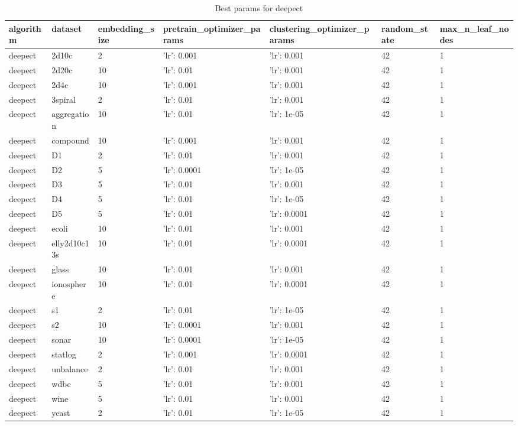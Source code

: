\begin{table}[H]
\centering
\caption{Best params for deepect}
\label{tab:params:deepect}
\begin{tabular}{|l|l|l|l|l|l|l|}
\hline
algorithm & dataset & embedding\_size & pretrain\_optimizer\_params & clustering\_optimizer\_params & random\_state & max\_n\_leaf\_nodes \\
\hline
deepect & 2d10c & 2 & {'lr': 0.001} & {'lr': 0.001} & 42 & 1 \\
\hline
deepect & 2d20c & 10 & {'lr': 0.01} & {'lr': 0.001} & 42 & 1 \\
\hline
deepect & 2d4c & 10 & {'lr': 0.001} & {'lr': 0.001} & 42 & 1 \\
\hline
deepect & 3spiral & 2 & {'lr': 0.01} & {'lr': 0.001} & 42 & 1 \\
\hline
deepect & aggregation & 10 & {'lr': 0.01} & {'lr': 1e-05} & 42 & 1 \\
\hline
deepect & compound & 10 & {'lr': 0.001} & {'lr': 0.001} & 42 & 1 \\
\hline
deepect & D1 & 2 & {'lr': 0.01} & {'lr': 0.001} & 42 & 1 \\
\hline
deepect & D2 & 5 & {'lr': 0.0001} & {'lr': 1e-05} & 42 & 1 \\
\hline
deepect & D3 & 5 & {'lr': 0.01} & {'lr': 0.001} & 42 & 1 \\
\hline
deepect & D4 & 5 & {'lr': 0.01} & {'lr': 1e-05} & 42 & 1 \\
\hline
deepect & D5 & 5 & {'lr': 0.01} & {'lr': 0.0001} & 42 & 1 \\
\hline
deepect & ecoli & 10 & {'lr': 0.01} & {'lr': 0.001} & 42 & 1 \\
\hline
deepect & elly2d10c13s & 10 & {'lr': 0.01} & {'lr': 0.0001} & 42 & 1 \\
\hline
deepect & glass & 10 & {'lr': 0.01} & {'lr': 0.001} & 42 & 1 \\
\hline
deepect & ionosphere & 10 & {'lr': 0.01} & {'lr': 0.0001} & 42 & 1 \\
\hline
deepect & s1 & 2 & {'lr': 0.01} & {'lr': 1e-05} & 42 & 1 \\
\hline
deepect & s2 & 10 & {'lr': 0.0001} & {'lr': 0.001} & 42 & 1 \\
\hline
deepect & sonar & 10 & {'lr': 0.0001} & {'lr': 1e-05} & 42 & 1 \\
\hline
deepect & statlog & 2 & {'lr': 0.001} & {'lr': 0.0001} & 42 & 1 \\
\hline
deepect & unbalance & 2 & {'lr': 0.01} & {'lr': 0.001} & 42 & 1 \\
\hline
deepect & wdbc & 5 & {'lr': 0.01} & {'lr': 0.001} & 42 & 1 \\
\hline
deepect & wine & 5 & {'lr': 0.01} & {'lr': 0.001} & 42 & 1 \\
\hline
deepect & yeast & 2 & {'lr': 0.01} & {'lr': 1e-05} & 42 & 1 \\
\hline
\end{tabular}
\end{table}